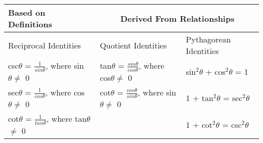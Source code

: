 \documentclass[30pt]{article}
\begin{document}
\begin{Large}

\begin{table}
\LARGE
\renewcommand{\arraystretch}{2}
\begin{tabular}{|l|l|l|}

\hline

\textbf {Based on Definitions} & \multicolumn{2}{c|}{\textbf{Derived From Relationships}}\\

\hline

Reciprocal Identities & Quotient Identities & Pythagorean Identities\\
\hline

csc$\theta$ = $\frac{1}{sin \theta}$, where sin$\theta \neq$ 0 & tan$\theta$ = $\frac{sin \theta}{cos \theta}$, where cos$\theta \neq$ 0 & sin$^2 \theta$ + cos$^2 \theta$ = 1\\
\hline
sec$\theta$ = $\frac{1}{cos \theta}$, where cos$\theta \neq$ 0 & cot$\theta$ = $\frac{cos \theta}{sin \theta}$, where sin$\theta \neq$ 0 & 1 + tan$^2 \theta$ = sec$^2 \theta$ \\
\hline
cot$\theta$ = $\frac{1}{tan \theta}$, where tan$\theta$ $\neq$ 0 & & 1 + cot$^2 \theta$ = csc$^2 \theta$\\
\hline 

\end{tabular} 
\end{table}
\end{Large}
\end{document}

